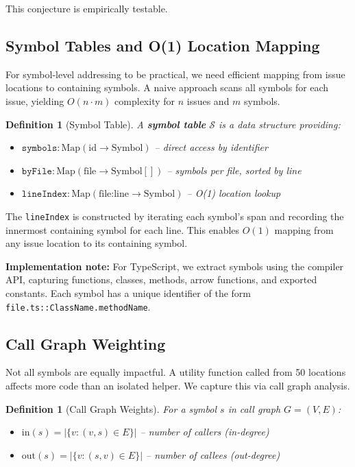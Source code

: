 \documentclass[11pt,a4paper]{article}
\newtheorem{definition}[theorem]{Definition}
\begin{document}
This conjecture is empirically testable.

\subsection{Symbol Tables and O(1) Location Mapping}

For symbol-level addressing to be practical, we need efficient mapping from issue locations to containing symbols. A naive approach scans all symbols for each issue, yielding $O(n \cdot m)$ complexity for $n$ issues and $m$ symbols.

\begin{definition}[Symbol Table]
A \textbf{symbol table} $\mathcal{S}$ is a data structure providing:
\begin{itemize}
  \item $\texttt{symbols}: \text{Map}(\text{id} \to \text{Symbol})$ -- direct access by identifier
  \item $\texttt{byFile}: \text{Map}(\text{file} \to \text{Symbol}[])$ -- symbols per file, sorted by line
  \item $\texttt{lineIndex}: \text{Map}(\text{file:line} \to \text{Symbol})$ -- O(1) location lookup
\end{itemize}
\end{definition}

The \texttt{lineIndex} is constructed by iterating each symbol's span and recording the innermost containing symbol for each line. This enables $O(1)$ mapping from any issue location to its containing symbol.

\textbf{Implementation note:} For TypeScript, we extract symbols using the compiler API, capturing functions, classes, methods, arrow functions, and exported constants. Each symbol has a unique identifier of the form \texttt{file.ts::ClassName.methodName}.

\subsection{Call Graph Weighting}

Not all symbols are equally impactful. A utility function called from 50 locations affects more code than an isolated helper. We capture this via call graph analysis.

\begin{definition}[Call Graph Weights]
For a symbol $s$ in call graph $G = (V, E)$:
\begin{itemize}
  \item $\text{in}(s) = |\{v : (v, s) \in E\}|$ -- number of callers (in-degree)
  \item $\text{out}(s) = |\{v : (s, v) \in E\}|$ -- number of callees (out-degree)
\end{itemize}
\end{definition}
\end{document}
